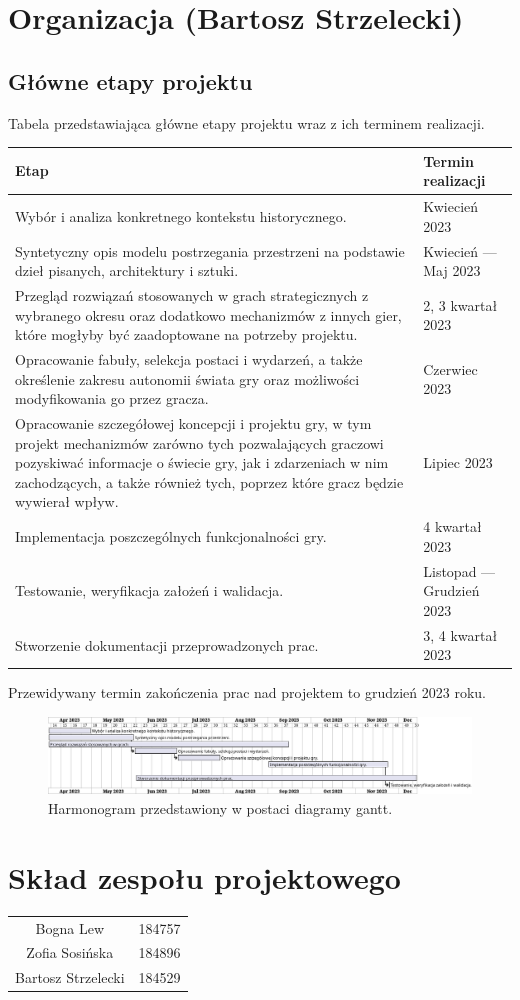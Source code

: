 \section{Organizacja (Bartosz Strzelecki)}
\subsection{Główne etapy projektu}
\begin{center}
  \caption{Tabela przedstawiająca główne etapy projektu wraz z ich terminem realizacji.}
  \begin{tabular}{| m{30em}| m{12em}||} 
  \hline
  Etap & Termin realizacji \\
  \hline\hline
  Wybór i analiza konkretnego kontekstu historycznego. & Kwiecień 2023 \\
  \hline
  Syntetyczny opis modelu postrzegania przestrzeni na podstawie dzieł pisanych, architektury i sztuki. & Kwiecień — Maj 2023 \\
  \hline
  Przegląd rozwiązań stosowanych w grach strategicznych z wybranego okresu oraz dodatkowo mechanizmów z innych gier, które mogłyby być zaadoptowane na potrzeby projektu. & 2, 3 kwartał 2023 \\
  \hline
  Opracowanie fabuły, selekcja postaci i wydarzeń, a także określenie zakresu autonomii świata gry oraz możliwości modyfikowania go przez gracza. & Czerwiec 2023 \\
  \hline
  Opracowanie szczegółowej koncepcji i projektu gry, w tym projekt mechanizmów zarówno tych pozwalających graczowi pozyskiwać informacje o świecie gry, jak i zdarzeniach w nim zachodzących, a także również tych, poprzez które gracz będzie wywierał wpływ. & Lipiec 2023 \\
  \hline
  Implementacja poszczególnych funkcjonalności gry. & 4 kwartał 2023 \\ 
  \hline
  Testowanie, weryfikacja założeń i walidacja. & Listopad — Grudzień 2023 \\
  \hline
  Stworzenie dokumentacji przeprowadzonych prac. & 3, 4 kwartał 2023 \\
  \hline
\end{tabular}
\end{center}
Przewidywany termin zakończenia prac nad projektem to grudzień 2023 roku.
\begin{figure}[htbp]
    \centering
    \includegraphics[width=1\textwidth]{uml/Harmonogram}
    \caption{Harmonogram przedstawiony w postaci diagramy gantt.}
\end{figure}
\section{Skład zespołu projektowego}
\begin{center}
  \begin{tabular}{ c c }
    Bogna Lew & 184757 \\
    Zofia Sosińska & 184896 \\
    Bartosz Strzelecki & 184529
  \end{tabular}
\end{center}
